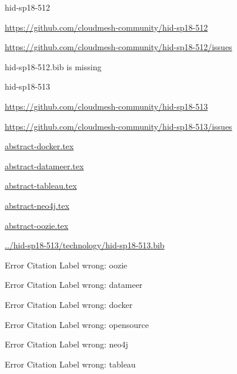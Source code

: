 \begin{IU}

hid-sp18-512

\url{https://github.com/cloudmesh-community/hid-sp18-512}

\url{https://github.com/cloudmesh-community/hid-sp18-512/issues}

hid-sp18-512.bib is missing

\end{IU}


\begin{IU}

hid-sp18-513

\url{https://github.com/cloudmesh-community/hid-sp18-513}

\url{https://github.com/cloudmesh-community/hid-sp18-513/issues}

\href{https://github.com/cloudmesh-community/hid-sp18-513/blob/master//technology/abstract-docker.tex}{abstract-docker.tex}

\href{https://github.com/cloudmesh-community/hid-sp18-513/blob/master//technology/abstract-datameer.tex}{abstract-datameer.tex}

\href{https://github.com/cloudmesh-community/hid-sp18-513/blob/master//technology/abstract-tableau.tex}{abstract-tableau.tex}

\href{https://github.com/cloudmesh-community/hid-sp18-513/blob/master//technology/abstract-neo4j.tex}{abstract-neo4j.tex}

\href{https://github.com/cloudmesh-community/hid-sp18-513/blob/master//technology/abstract-oozie.tex}{abstract-oozie.tex}

\href{https://github.com/cloudmesh-community/hid-sp18-513/blob/master//technology/hid-sp18-513.bib}{../hid-sp18-513/technology/hid-sp18-513.bib}

 Error Citation Label wrong: oozie

 Error Citation Label wrong: datameer

 Error Citation Label wrong: docker

 Error Citation Label wrong: opensource

 Error Citation Label wrong: neo4j

 Error Citation Label wrong: tableau

\end{IU}


